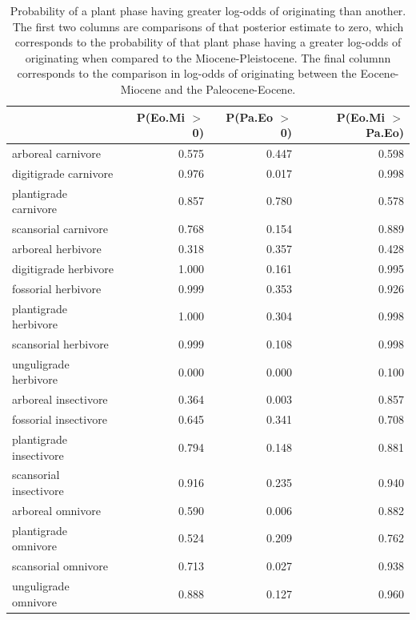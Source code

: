\documentclass[12pt,letterpaper]{article}
\begin{document}
\begin{table}[ht]
  \centering
  \caption[Posterior probablity estimates of differences in origination by plant phase]{Probability of a plant phase having greater log-odds of originating than another. The first two columns are comparisons of that posterior estimate to zero, which corresponds to the probability of that plant phase having a greater log-odds of originating when compared to the Miocene-Pleistocene. The final columnn corresponds to the comparison in log-odds of originating between the Eocene-Miocene and the Paleocene-Eocene.} 
  \label{tab:origin_plant}
  \begin{tabular}{ l r r r }
    \hline
    & P(Eo.Mi $>$ 0) & P(Pa.Eo $>$ 0) & P(Eo.Mi $>$ Pa.Eo) \\ 
    \hline
    arboreal carnivore & 0.575 & 0.447 & 0.598 \\ 
    digitigrade carnivore & 0.976 & 0.017 & 0.998 \\ 
    plantigrade carnivore & 0.857 & 0.780 & 0.578 \\ 
    scansorial carnivore & 0.768 & 0.154 & 0.889 \\ 
    arboreal herbivore & 0.318 & 0.357 & 0.428 \\ 
    digitigrade herbivore & 1.000 & 0.161 & 0.995 \\ 
    fossorial herbivore & 0.999 & 0.353 & 0.926 \\ 
    plantigrade herbivore & 1.000 & 0.304 & 0.998 \\ 
    scansorial herbivore & 0.999 & 0.108 & 0.998 \\ 
    unguligrade herbivore & 0.000 & 0.000 & 0.100 \\ 
    arboreal insectivore & 0.364 & 0.003 & 0.857 \\ 
    fossorial insectivore & 0.645 & 0.341 & 0.708 \\ 
    plantigrade insectivore & 0.794 & 0.148 & 0.881 \\ 
    scansorial insectivore & 0.916 & 0.235 & 0.940 \\ 
    arboreal omnivore & 0.590 & 0.006 & 0.882 \\ 
    plantigrade omnivore & 0.524 & 0.209 & 0.762 \\ 
    scansorial omnivore & 0.713 & 0.027 & 0.938 \\ 
    unguligrade omnivore & 0.888 & 0.127 & 0.960 \\ 
    \hline
  \end{tabular}
\end{table}
\end{document}

